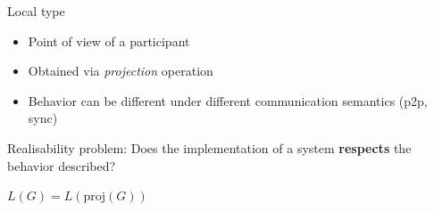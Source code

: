 \documentclass{beamer}
\begin{document}
\begin{frame}{Local type}
	\begin{itemize}
		\item Point of view of a participant
		\item Obtained via \textit{projection} operation
		\item Behavior can be different under different communication semantics (p2p, sync) 
	\end{itemize}

	\bigskip

	Realisability problem: Does the implementation of a system \textbf{respects}
	the behavior described?

	\bigskip

	$L(G) = L(\text{proj}(G))$




\end{frame}

\end{document}
